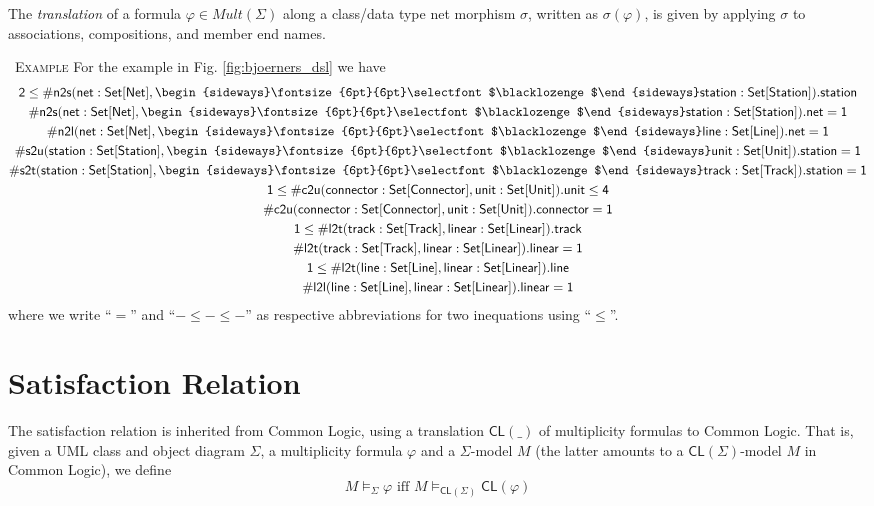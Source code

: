 \documentclass[10pt,fleqn,%
\ifpretendfinal
final%
\else
draft%
\fi,
]{scrreprt}
\newcommand*{\CL}{\ensuremath{\mathsf{CL}}\xspace}
\newenvironment{example}[0]{\ \newline \textsc{Example}\quad }{}
\newcommand{\composition}{\raisebox{0.2pt}{\begin{sideways}\fontsize{6pt}{6pt}\selectfont$\blacklozenge$\end{sideways}}}
\begin{document}
The \emph{translation} of a formula $\varphi \in \mathit{Mult}(\Sigma)$
along a class/data type net morphism $\sigma$, written as $\sigma(\varphi)$,
is given by applying $\sigma$ to associations, compositions, and member end
names.


\begin{example}
For the example in Fig. \ref{fig:bjoerners_dsl} we have
\begin{gather*}
  \mathsf{2 \leq \#n2s(net : Set[Net], \composition station : Set[Station]).station}
\\
  \mathsf{\#n2s(net : Set[Net], \composition station : Set[Station]).net = 1}
\\
  \mathsf{\#n2l(net : Set[Net], \composition line : Set[Line]).net = 1}
\\
  \mathsf{\#s2u(station : Set[Station], \composition unit : Set[Unit]).station = 1}
\\
  \mathsf{\#s2t(station : Set[Station], \composition track : Set[Track]).station = 1}
\\
  \mathsf{1 \leq \#c2u(connector : Set[Connector], unit : Set[Unit]).unit \leq 4}
\\
  \mathsf{\#c2u(connector : Set[Connector], unit : Set[Unit]).connector = 1}
\\
  \mathsf{1 \leq \#l2t(track : Set[Track], linear : Set[Linear]).track}
\\
  \mathsf{\#l2t(track : Set[Track], linear : Set[Linear]).linear = 1}
\\
  \mathsf{1 \leq \#l2t(line : Set[Line], linear : Set[Linear]).line}
\\
  \mathsf{\#l2l(line : Set[Line], linear : Set[Linear]).linear = 1}
\end{gather*}
%
where we write ``$=$'' and ``${-} \leq {-} \leq {-}$'' as respective
abbreviations for two inequations using ``$\leq$''.
\end{example}


\section{Satisfaction Relation}
The satisfaction relation is inherited from Common Logic, using
a translation $\CL(\_)$ of multiplicity formulas to Common Logic.
That is, given a UML class and object diagram $\Sigma$, a
multiplicity formula $\varphi$ and a $\Sigma$-model $M$ (the
latter amounts to a $\CL(\Sigma)$-model $M$ in Common Logic), we define
$$M\models_\Sigma\varphi\text{ iff }M\models_{\CL(\Sigma)}\CL(\varphi)$$
\end{document}
